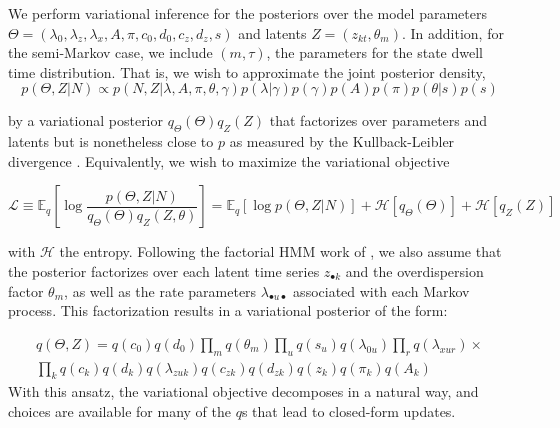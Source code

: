 \documentclass[10pt,letterpaper]{article}
\begin{document}
We perform variational inference for the posteriors over the model parameters $\Theta = (\lambda_0, \lambda_z, \lambda_x, A, \pi, c_0, d_0, c_z, d_z, s)$ and latents $Z=(z_{kt},\theta_m)$. In addition, for the semi-Markov case, we include $(m, \tau)$, the parameters for the state dwell time distribution. That is, we wish to approximate the joint posterior density, 
\begin{equation}
    p(\Theta,Z|N) \propto p(N, Z |\lambda, A, \pi, \theta, \gamma) 
    p(\lambda|\gamma) p(\gamma)
    p(A)p(\pi)p(\theta|s)p(s)
\end{equation}

by a variational posterior $q_\Theta(\Theta)q_Z(Z)$ that factorizes over parameters and latents but is nonetheless close to $p$ as measured by the Kullback-Leibler divergence \cite{Wainwright2008-ii}. Equivalently, we wish to maximize the variational objective

\begin{equation}
    \mathcal{L} \equiv \mathbb{E}_q \left[\log \frac{p(\Theta,Z|N)}{q_\Theta(\Theta)q_Z(Z,\theta)} \right] = \mathbb{E}_q \left[\log p(\Theta,Z|N) \right] + \mathcal{H}[q_\Theta(\Theta)] + \mathcal{H}[q_Z(Z)]
\end{equation}

with $\mathcal{H}$ the entropy. Following the factorial HMM work of \cite{ghahramani1997factorial}, we also assume that the posterior factorizes over each latent time series $z_{\bullet k}$ and the overdispersion factor $\theta_m$, as well as the rate parameters $\lambda_{\bullet u \bullet}$ associated with each Markov process.  This factorization results in a variational posterior of the form:

\begin{multline}
    q(\Theta,Z) = q(c_0)q(d_0)\prod_m q(\theta_m) \prod_u q(s_u) q(\lambda_{0u}) \prod_r q(\lambda_{xur}) \times \\ 
    \prod_k q(c_k) q(d_k) 
    q(\lambda_{zuk}) q(c_{zk}) q(d_{zk}) q(z_k) q(\pi_k) q(A_k)
\end{multline}
With this ansatz, the variational objective decomposes in a natural way, and choices are available for many of the $q$s that lead to closed-form updates.
\end{document}
